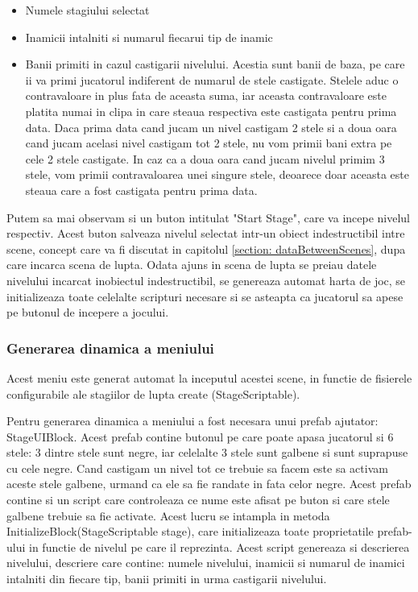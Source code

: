 \documentclass[12pt, a4paper]{article}
\begin{document}
	\begin{itemize}
		\item Numele stagiului selectat
		\item Inamicii intalniti si numarul fiecarui tip de inamic
		\item Banii primiti in cazul castigarii nivelului. Acestia sunt banii de baza, pe care ii va primi jucatorul indiferent de numarul de stele castigate. Stelele aduc o contravaloare in plus fata de aceasta suma, iar aceasta contravaloare este platita numai in clipa in care steaua respectiva este castigata pentru prima data. Daca prima data cand jucam un nivel castigam 2 stele si a doua oara cand jucam acelasi nivel castigam tot 2 stele, nu vom primii bani extra pe cele 2 stele castigate. In caz ca a doua oara cand jucam nivelul primim 3 stele, vom primii contravaloarea unei singure stele, deoarece doar aceasta este steaua care a fost castigata pentru prima data.
	\end{itemize}
	
	Putem sa mai observam si un buton intitulat "Start Stage", care va incepe nivelul respectiv. Acest buton salveaza nivelul selectat intr-un obiect indestructibil intre scene, concept care va fi discutat in capitolul \ref{section: dataBetweenScenes}, dupa care incarca scena de lupta. Odata ajuns in scena de lupta se preiau datele nivelului incarcat inobiectul indestructibil, se genereaza automat harta de joc, se initializeaza toate celelalte scripturi necesare si se asteapta ca jucatorul sa apese pe butonul de incepere a jocului.
	\newline
	
	\subsubsection{Generarea dinamica a meniului}
	
	Acest meniu este generat automat la inceputul acestei scene, in functie de fisierele configurabile ale stagiilor de lupta create (StageScriptable).
	\newline
	
	Pentru generarea dinamica a meniului a fost necesara unui prefab ajutator: StageUIBlock. Acest prefab contine butonul pe care poate apasa jucatorul si 6 stele: 3 dintre stele sunt negre, iar celelalte 3 stele sunt galbene si sunt suprapuse cu cele negre. Cand castigam un nivel tot ce trebuie sa facem este sa activam aceste stele galbene, urmand ca ele sa fie randate in fata celor negre. Acest prefab contine si un script care controleaza ce nume este afisat pe buton si care stele galbene trebuie sa fie activate. Acest lucru se intampla in metoda InitializeBlock(StageScriptable stage), care initializeaza toate proprietatile prefab-ului in functie de nivelul pe care il reprezinta. Acest script genereaza si descrierea nivelului, descriere care contine: numele nivelului, inamicii si numarul de inamici intalniti din fiecare tip, banii primiti in urma castigarii nivelului.
	\newline
	
\end{document}
